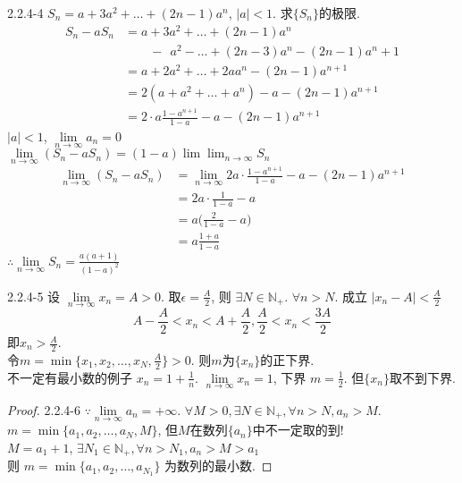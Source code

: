 	2.2.4-4
	$ S_n = a+3a^2+\dots+(2n-1)a^n $, $ |a|<1 $. 求$ \{S_n\} $的极限.
	\begin{align*}
		S_n-aS_n
		&=a+3a^2+\dots+(2n-1)a^n\\
		&\qquad-\;\,a^2-\dots+(2n-3)a^n-(2n-1)a^n+1\\
		&=a+2a^2+\dots+2aa^n-(2n-1)a^{n+1}\\
		&=2(a+a^2+\dots+a^n)-a-(2n-1)a^{n+1}\\
		&=2\cdot{a}\frac{1-a^{n+1}}{1-a}-a-(2n-1)a^{n+1}
	\end{align*}
	$ |a|<1 $, $ \lim\limits_{n\rightarrow\infty}a_n=0 $\\
	$ \lim\limits_{n\rightarrow\infty}(S_n-aS_n) = (1-a)\lim\lim_{n\rightarrow\infty}S_n $
	\begin{align*}
		\lim_{n\rightarrow\infty}(S_n-aS_n)
		&=\lim_{n\rightarrow\infty}
		2a\cdot\frac{1-a^{n+1}}{1-a}-a-(2n-1)a^{n+1}\\
		&=2a\cdot\frac{1}{1-a}-a\\
		&=a\Big(\frac{2}{1-a}-a\Big)\\
		&=a\frac{1+a}{1-a}
	\end{align*}
$ \therefore \lim\limits_{n\rightarrow\infty} S_n = \frac{a(a+1)}{(1-a)^2} $

	2.2.4-5
	设 $ \lim\limits_{n\rightarrow\infty} x_n = A>0 $. 取$ \epsilon = \frac{A}{2} $, 则 $ \exists N\in\mathbb{N}_+ $. $ \forall n>N $. 成立 $ |x_n-A|<\frac{A}{2} $ 
	\begin{equation*}
		A-\frac{A}{2}<x_n<A+\frac{A}{2}, \frac{A}{2}<x_n<\frac{3A}{2}
	\end{equation*}
	即$ x_n>\frac{A}{2} $.\\
	令$ m = \min\{x_1,x_2,\dots,x_N,\frac{A}{2}\} >0 $. 则$ m $为$ \{x_n\} $的正下界.\\
	不一定有最小数的例子 $ x_n = 1+\frac{1}{n} $. $ \lim\limits_{n\rightarrow\infty}x_n = 1 $, 下界 $ m=  \frac{1}{2} $. 但$ \{x_n\} $取不到下界.

\begin{proof}
	2.2.4-6
	$ \because\lim\limits_{n\rightarrow\infty} a_n = +\infty $. $ \forall M>0, \exists N\in\mathbb{N}_+, \forall n>N, a_n>M $.\\
	$ m = \min\{a_1,a_2,\dots,a_N,M\} $, 但$ M $在数列$ \{a_n\} $中不一定取的到!\\
	$ M=a_1+1 $, $ \exists N_1\in\mathbb{N}_+, \forall n>N_1, a_n>M>a_1 $\\
	则 $ m = \min\{a_1,a_2,\dots,a_{N_1}\} $ 为数列的最小数.	
\end{proof}

